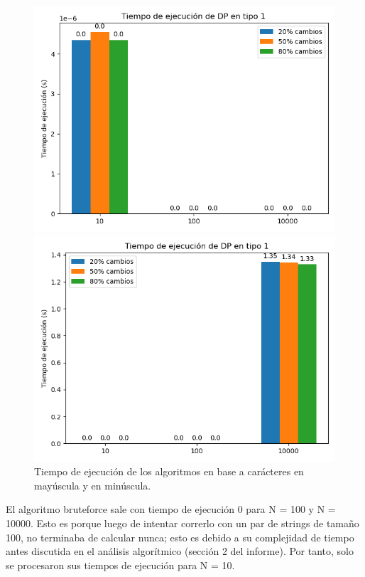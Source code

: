 \begin{figure}[H]
    \centering
    \begin{minipage}[t]{0.5\textwidth}
        \includegraphics[width=\textwidth]{images/1_bruteforce.png}
    \end{minipage}%
    \begin{minipage}[t]{0.5\textwidth}
        \includegraphics[width=\textwidth]{images/1_dp.png}    \end{minipage}%
    \caption{Tiempo de ejecución de los algoritmos en base a carácteres en mayúscula y en minúscula.}
    \label{fig:scatterplot_3}
\end{figure}

El algoritmo bruteforce sale con tiempo de ejecución 0 para N = 100 y N = 10000. Esto es porque luego de intentar correrlo con un par de strings de tamaño 100, no terminaba de calcular nunca; esto es debido a su complejidad de tiempo antes discutida en el análisis algorítmico (sección 2 del informe). Por tanto, solo se procesaron sus tiempos de ejecución para N = 10.

